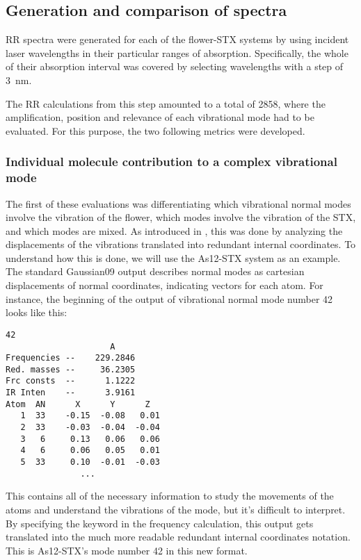 \subsection{Generation and comparison of spectra}
RR spectra were generated for each of the flower-STX systems by using incident laser wavelengths in their particular ranges of absorption.
Specifically, the whole of their absorption interval was covered by selecting wavelengths with a step of \SI{3}{\nano\metre}.

The RR calculations from this step amounted to a total of 2858, where the amplification, position and relevance of each vibrational mode had to be evaluated.
For this purpose, the two following metrics were developed.

\subsubsection{Individual molecule contribution to a complex vibrational mode}
The first of these evaluations was differentiating which vibrational normal modes involve the vibration of the flower, which modes involve the vibration of the STX, and which modes are mixed.
As introduced in , this was done by analyzing the displacements of the vibrations translated into redundant internal coordinates.
To understand how this is done, we will use the As12-STX system as an example.
The standard Gaussian09 output describes normal modes as cartesian displacements of normal coordinates, indicating vectors for each atom.
For instance, the beginning of the output of vibrational normal mode number 42 looks like this:

\begin{lstlisting}[label=normal-mode-output, style=kaolstplain]
                    42
                     A
Frequencies --    229.2846
Red. masses --     36.2305
Frc consts  --      1.1222
IR Inten    --      3.9161
Atom  AN      X      Y      Z
   1  33    -0.15  -0.08   0.01
   2  33    -0.03  -0.04  -0.04
   3   6     0.13   0.06   0.06
   4   6     0.06   0.05   0.01
   5  33     0.10  -0.01  -0.03
               ...
\end{lstlisting}

This contains all of the necessary information to study the movements of the atoms and understand the vibrations of the mode, but it's difficult to interpret.
By specifying the keyword  in the frequency calculation, this output gets translated into the much more readable redundant internal coordinates notation.
This is As12-STX's mode number 42 in this new format.

